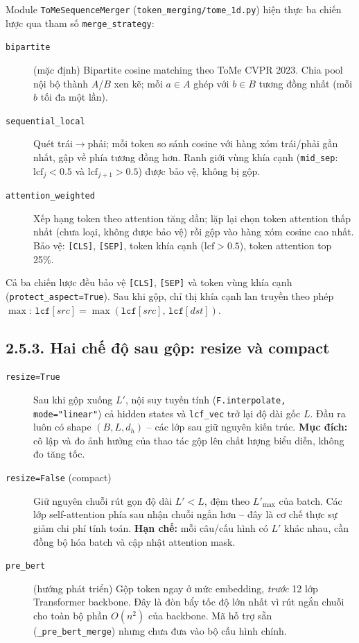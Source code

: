 Module \texttt{ToMeSequenceMerger} (\texttt{token\_merging/tome\_1d.py})
hiện thực ba chiến lược qua tham số \texttt{merge\_strategy}:

\begin{description}
  \item[\texttt{bipartite}] (mặc định) Bipartite cosine matching theo
    ToMe CVPR 2023. Chia pool nội bộ thành $A$/$B$ xen kẽ; mỗi $a \in A$
    ghép với $b \in B$ tương đồng nhất (mỗi $b$ tối đa một lần).

  \item[\texttt{sequential\_local}] Quét trái$\to$phải; mỗi token so
    sánh cosine với hàng xóm trái/phải gần nhất, gập về phía tương đồng
    hơn. Ranh giới vùng khía cạnh (\texttt{mid\_sep}: $\text{lcf}_j{<}0.5$
    và $\text{lcf}_{j+1}{>}0.5$) được bảo vệ, không bị gộp.

  \item[\texttt{attention\_weighted}] Xếp hạng token theo attention tăng
    dần; lặp lại chọn token attention thấp nhất (chưa loại, không được
    bảo vệ) rồi gộp vào hàng xóm cosine cao nhất. Bảo vệ: \texttt{[CLS]},
    \texttt{[SEP]}, token khía cạnh ($\text{lcf}{>}0.5$), token attention
    top 25\%.
\end{description}

Cả ba chiến lược đều bảo vệ \texttt{[CLS]}, \texttt{[SEP]} và token
vùng khía cạnh (\texttt{protect\_aspect=True}). Sau khi gộp, chỉ thị
khía cạnh lan truyền theo phép $\max$:
$\texttt{lcf}[src] = \max(\texttt{lcf}[src],\,\texttt{lcf}[dst])$.

\subsection{2.5.3.\; Hai chế độ sau gộp: resize và compact}
\label{subsec:tome_modes}

\begin{description}
  \item[\texttt{resize=True}] Sau khi gộp xuống $L'$, nội suy tuyến tính
    (\texttt{F.interpolate, mode="linear"}) cả hidden states và
    \texttt{lcf\_vec} trở lại độ dài gốc $L$. Đầu ra luôn có shape
    $(B, L, d_h)$ -- các lớp sau giữ nguyên kiến trúc. \textbf{Mục đích:}
    cô lập và đo ảnh hưởng của thao tác gộp lên chất lượng biểu diễn,
    không đo tăng tốc.

  \item[\texttt{resize=False} (compact)] Giữ nguyên chuỗi rút gọn độ
    dài $L' < L$, đệm theo $L'_{\max}$ của batch. Các lớp self-attention
    phía sau nhận chuỗi ngắn hơn -- đây là cơ chế thực sự giảm chi phí
    tính toán. \textbf{Hạn chế:} mỗi câu/cấu hình có $L'$ khác nhau,
    cần đồng bộ hóa batch và cập nhật attention mask.

  \item[\texttt{pre\_bert}] (hướng phát triển) Gộp token ngay ở mức
    embedding, \emph{trước} 12 lớp Transformer backbone. Đây là đòn bẩy
    tốc độ lớn nhất vì rút ngắn chuỗi cho toàn bộ phần $O(n^2)$ của
    backbone. Mã hỗ trợ sẵn (\texttt{\_pre\_bert\_merge}) nhưng chưa
    đưa vào bộ cấu hình chính.
\end{description}

